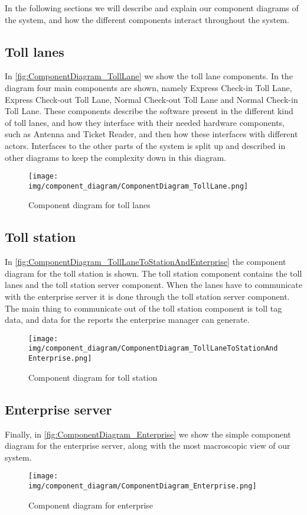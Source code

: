 
In the following sections we will describe and explain our component diagrams of the system, and how the different components interact throughout the system.
\subsection*{Toll lanes}
In \autoref{fig:ComponentDiagram_TollLane} we show the toll lane components. In the diagram four main components are shown, namely Express Check-in Toll Lane, Express Check-out Toll Lane, Normal Check-out Toll Lane and Normal Check-in Toll Lane. These components describe the software present in the different kind of toll lanes, and how they interface with their needed hardware components, such as Antenna and Ticket Reader, and then how these interfaces with different actors. Interfaces to the other parts of the system is split up and described in other diagrams to keep the complexity down in this diagram.
\begin{figure}
\centering
\texttt{[image: img/component\_diagram/ComponentDiagram\_TollLane.png]}
\caption{Component diagram for toll lanes}
\label{fig:ComponentDiagram_TollLane}
\end{figure}

\subsection*{Toll station}
In \autoref{fig:ComponentDiagram_TollLaneToStationAndEnterprise} the component diagram for the toll station is shown. The toll station component contains the toll lanes and the toll station server component. When the lanes have to communicate with the enterprise server it is done through the toll station server component. The main thing to communicate out of the toll station component is toll tag data, and data for the reports the enterprise manager can generate.
\begin{figure}
\centering
\texttt{[image: img/component\_diagram/ComponentDiagram\_TollLaneToStationAndEnterprise.png]}
\caption{Component diagram for toll station}
\label{fig:ComponentDiagram_TollLaneToStationAndEnterprise}
\end{figure}

\subsection*{Enterprise server}
Finally, in \autoref{fig:ComponentDiagram_Enterprise} we show the simple component diagram for the enterprise server, along with the most macroscopic view of our system. 
\begin{figure}
\centering
\texttt{[image: img/component\_diagram/ComponentDiagram\_Enterprise.png]}
\caption{Component diagram for enterprise}
\label{fig:ComponentDiagram_Enterprise}
\end{figure}
